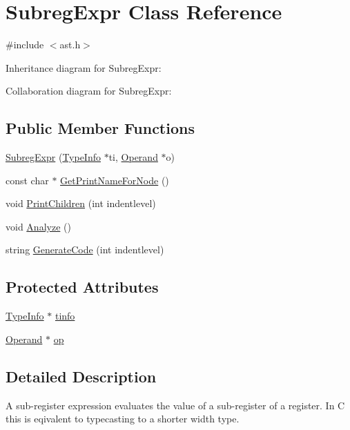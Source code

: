 \hypertarget{class_subreg_expr}{}\section{Subreg\+Expr Class Reference}
\label{class_subreg_expr}


{\ttfamily \#include $<$ast.\+h$>$}



Inheritance diagram for Subreg\+Expr\+:


Collaboration diagram for Subreg\+Expr\+:
\subsection*{Public Member Functions}
\begin{DoxyCompactItemize}
\item 
\hyperlink{class_subreg_expr_a5ff067d8a0a8e7d8482a88903389e5b0}{Subreg\+Expr} (\hyperlink{class_type_info}{Type\+Info} $\ast$ti, \hyperlink{class_operand}{Operand} $\ast$o)
\item 
const char $\ast$ \hyperlink{class_subreg_expr_a21bea1838b9fe850b49d6a3a31dc99bc}{Get\+Print\+Name\+For\+Node} ()
\item 
void \hyperlink{class_subreg_expr_a958cb7d3d07cb2b8f1b15759c03fda9d}{Print\+Children} (int indentlevel)
\item 
void \hyperlink{class_subreg_expr_acc9be43aae902cf0727ba6b7ab8d85b1}{Analyze} ()
\item 
string \hyperlink{class_subreg_expr_a4604758277a1e78e9b5f9bb4cdc7b2cd}{Generate\+Code} (int indentlevel)
\end{DoxyCompactItemize}
\subsection*{Protected Attributes}
\begin{DoxyCompactItemize}
\item 
\hyperlink{class_type_info}{Type\+Info} $\ast$ \hyperlink{class_subreg_expr_a7ab464c6b134f8a695c333d46ca3802a}{tinfo}
\item 
\hyperlink{class_operand}{Operand} $\ast$ \hyperlink{class_subreg_expr_a3cbc3de0867bd62be54698de5d4c24ac}{op}
\end{DoxyCompactItemize}


\subsection{Detailed Description}
A sub-\/register expression evaluates the value of a sub-\/register of a register. In C this is eqivalent to typecasting to a shorter width type. 

